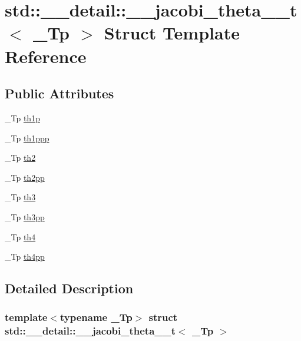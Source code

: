 \hypertarget{structstd_1_1____detail_1_1____jacobi__theta__0__t}{}\section{std\+:\+:\+\_\+\+\_\+detail\+:\+:\+\_\+\+\_\+jacobi\+\_\+theta\+\_\+\_\+t$<$ \+\_\+\+Tp $>$ Struct Template Reference}
\label{structstd_1_1____detail_1_1____jacobi__theta__0__t}
\subsection*{Public Attributes}
\begin{DoxyCompactItemize}
\item 
\+\_\+\+Tp \hyperlink{structstd_1_1____detail_1_1____jacobi__theta__0__t_a2bf099fa870656a7b3bf0558f44da871}{th1p}
\item 
\+\_\+\+Tp \hyperlink{structstd_1_1____detail_1_1____jacobi__theta__0__t_a6d9a43e21e4aaa006f13c89fba379151}{th1ppp}
\item 
\+\_\+\+Tp \hyperlink{structstd_1_1____detail_1_1____jacobi__theta__0__t_af3dbc8b0e2439d31ddd938624d6e9db7}{th2}
\item 
\+\_\+\+Tp \hyperlink{structstd_1_1____detail_1_1____jacobi__theta__0__t_a717ffe737ba14fc9a19a81f56cc09803}{th2pp}
\item 
\+\_\+\+Tp \hyperlink{structstd_1_1____detail_1_1____jacobi__theta__0__t_a0acbb4849b8343da27197aa86bbdc1f3}{th3}
\item 
\+\_\+\+Tp \hyperlink{structstd_1_1____detail_1_1____jacobi__theta__0__t_aafea78b094a866e101d4266068514fa0}{th3pp}
\item 
\+\_\+\+Tp \hyperlink{structstd_1_1____detail_1_1____jacobi__theta__0__t_ab6eba035eef2ccdc3e63b124978b3a61}{th4}
\item 
\+\_\+\+Tp \hyperlink{structstd_1_1____detail_1_1____jacobi__theta__0__t_a1b051490c9e6c438c3edadd5d13b3810}{th4pp}
\end{DoxyCompactItemize}


\subsection{Detailed Description}
\subsubsection*{template$<$typename \+\_\+\+Tp$>$\newline
struct std\+::\+\_\+\+\_\+detail\+::\+\_\+\+\_\+jacobi\+\_\+theta\+\_\+\_\+t$<$ \+\_\+\+Tp $>$}



